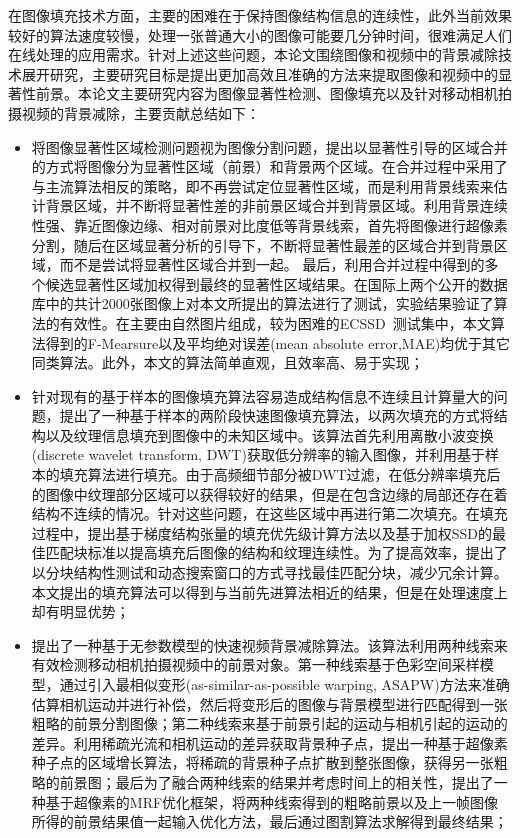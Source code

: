 \par
在图像填充技术方面，主要的困难在于保持图像结构信息的连续性，此外当前效果较好的算法速度较慢，处理一张普通大小的图像可能要几分钟时间，很难满足人们在线处理的应用需求。针对上述这些问题，本论文围绕图像和视频中的背景减除技术展开研究，主要研究目标是提出更加高效且准确的方法来提取图像和视频中的显著性前景。本论文主要研究内容为图像显著性检测、图像填充以及针对移动相机拍摄视频的背景减除，主要贡献总结如下：
 \begin{itemize}
    \item 将图像显著性区域检测问题视为图像分割问题，提出以显著性引导的区域合并的方式将图像分为显著性区域（前景）和背景两个区域。在合并过程中采用了与主流算法相反的策略，即不再尝试定位显著性区域，而是利用背景线索来估计背景区域，并不断将显著性差的非前景区域合并到背景区域。利用背景连续性强、靠近图像边缘、相对前景对比度低等背景线索，首先将图像进行超像素分割，随后在区域显著分析的引导下，不断将显著性最差的区域合并到背景区域，而不是尝试将显著性区域合并到一起。 最后，利用合并过程中得到的多个候选显著性区域加权得到最终的显著性区域结果。在国际上两个公开的数据库中的共计2000张图像上对本文所提出的算法进行了测试，实验结果验证了算法的有效性。在主要由自然图片组成，较为困难的ECSSD~\cite{ECSSD}测试集中，本文算法得到的F-Mearsure以及平均绝对误差(mean absolute error,MAE)均优于其它同类算法。此外，本文的算法简单直观，且效率高、易于实现；
    \item 针对现有的基于样本的图像填充算法容易造成结构信息不连续且计算量大的问题，提出了一种基于样本的两阶段快速图像填充算法，以两次填充的方式将结构以及纹理信息填充到图像中的未知区域中。该算法首先利用离散小波变换(discrete wavelet transform, DWT)获取低分辨率的输入图像，并利用基于样本的填充算法进行填充。由于高频细节部分被DWT过滤，在低分辨率填充后的图像中纹理部分区域可以获得较好的结果，但是在包含边缘的局部还存在着结构不连续的情况。针对这些问题，在这些区域中再进行第二次填充。在填充过程中，提出基于梯度结构张量的填充优先级计算方法以及基于加权SSD的最佳匹配块标准以提高填充后图像的结构和纹理连续性。为了提高效率，提出了以分块结构性测试和动态搜索窗口的方式寻找最佳匹配分块，减少冗余计算。本文提出的填充算法可以得到与当前先进算法相近的结果，但是在处理速度上却有明显优势；
    \item 提出了一种基于无参数模型的快速视频背景减除算法。该算法利用两种线索来有效检测移动相机拍摄视频中的前景对象。第一种线索基于色彩空间采样模型，通过引入最相似变形(as-similar-as-possible warping, ASAPW)方法来准确估算相机运动并进行补偿，然后将变形后的图像与背景模型进行匹配得到一张粗略的前景分割图像；第二种线索来基于前景引起的运动与相机引起的运动的差异。利用稀疏光流和相机运动的差异获取背景种子点，提出一种基于超像素种子点的区域增长算法，将稀疏的背景种子点扩散到整张图像，获得另一张粗略的前景图；最后为了融合两种线索的结果并考虑时间上的相关性，提出了一种基于超像素的MRF优化框架，将两种线索得到的粗略前景以及上一帧图像所得的前景结果值一起输入优化方法，最后通过图割算法求解得到最终结果；

\end{itemize}
